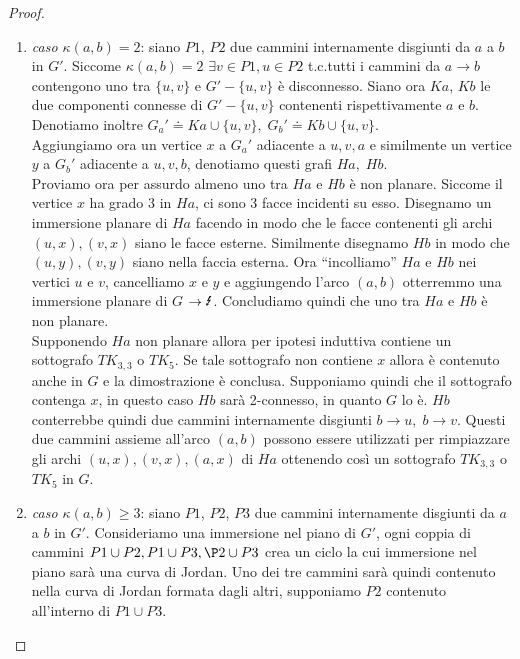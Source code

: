 \begin{teorema}
\begin{proof}
\begin{enumerate}
            \item \textit{caso \(\kappa(a,b)=2\)}: siano \(P1\), \(P2\) due cammini internamente disgiunti da \(a\) a \(b\) in \(G'\). Siccome \(\kappa(a,b)=2\) \(\exists v \in P1, u \in P2\) t.c.\@ tutti i cammini da \(a \to b\) contengono uno tra
            \(\{ u,v \} \) e \(G'-\{ u,v \} \) è disconnesso. Siano ora \(Ka\), \(Kb\) le due componenti connesse di \(G'-\{ u,v\} \) 
            contenenti rispettivamente \(a\) e \(b\). Denotiamo inoltre \(G_a' \doteq Ka \cup \{ u,v \},\; G_b' \doteq Kb \cup \{ u,v\} \).
            \\ Aggiungiamo ora un vertice \(x\) a \(G_a'\) adiacente a \(u,v,a\) e similmente un vertice \(y\) a \(G_b'\) adiacente a \(u,v,b\), denotiamo questi grafi \(Ha,\; Hb\). 
            \\ Proviamo ora per assurdo almeno uno tra \(Ha\) e \(Hb\) è non planare. Siccome il vertice \(x\) ha grado 3 in \(Ha\), ci sono 3 facce incidenti su esso. Disegnamo un immersione planare di \(Ha\) facendo in modo che le facce contenenti gli archi \((u,x), (v,x)\) siano le facce esterne. Similmente disegnamo \(Hb\) in modo che \((u,y),(v,y)\) siano nella faccia esterna. Ora “incolliamo” \(Ha\) e \(Hb\) nei vertici \(u\) e \(v\), cancelliamo \(x\) e \(y\) e aggiungendo l'arco \((a,b)\)
            otterremmo una immersione planare di \(G\) \(\rightarrow \text{\Lightning}\). Concludiamo quindi che uno tra \(Ha\) e \(Hb\) è non planare.\\
            Supponendo \(Ha\) non planare allora per ipotesi induttiva contiene un sottografo \(TK_{3,3}\) o \(TK_5\). Se tale sottografo non contiene \(x\) allora è contenuto anche in \(G\) e la dimostrazione è conclusa. Supponiamo quindi che il sottografo contenga \(x\), in questo caso \(Hb\) sarà 2-connesso, in quanto \(G\) lo è. \(Hb\) conterrebbe quindi due cammini internamente disgiunti \(b \to u,\; b\to v\). 
            Questi due cammini assieme all'arco \((a,b)\) possono essere utilizzati per rimpiazzare gli archi \((u,x),(v,x),(a,x)\) di \(Ha\) ottenendo così un sottografo \(TK_{3,3}\) o \(TK_5\) in \(G\).
            \item \textit{caso \(\kappa(a,b)\geq 3\)}: siano \(P1\), \(P2\), \(P3\) due cammini internamente disgiunti da \(a\) a \(b\) in \(G'\). Consideriamo una immersione nel piano di \(G'\), ogni coppia di cammini \(P1 \cup P2, P1 \cup P3, \P2 \cup P3\) crea un ciclo la cui immersione nel piano sarà una curva di Jordan. Uno dei tre cammini sarà quindi contenuto nella curva di Jordan formata dagli altri, supponiamo \(P2\) contenuto all'interno di \(P1 \cup P3\).

\end{enumerate}
\end{proof}
\end{teorema}
